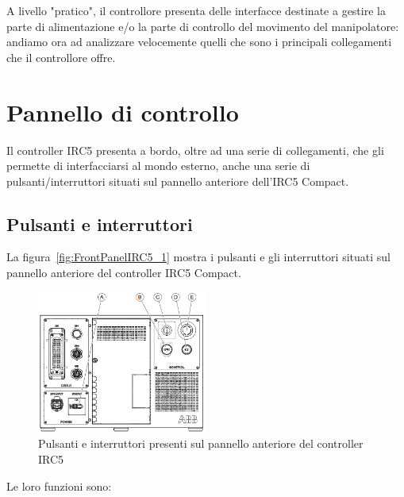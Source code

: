 A livello "pratico", il controllore presenta delle interfacce destinate a gestire la parte di alimentazione e/o la parte di controllo del movimento del manipolatore: andiamo ora ad analizzare velocemente quelli che sono i principali collegamenti che il controllore offre.
\section{Pannello di controllo}
Il controller IRC5 presenta a bordo, oltre ad una serie di collegamenti, che gli permette di interfacciarsi al mondo esterno, anche una serie di pulsanti/interruttori situati sul pannello anteriore dell’IRC5 Compact.

\subsection{Pulsanti e interruttori}
La figura~\vref{fig:FrontPanelIRC5_1} mostra i pulsanti e gli interruttori situati sul pannello anteriore del controller IRC5 Compact.
\begin{figure}[h]
	\centering
	\includegraphics[width=0.5\textwidth]{Immagini/Pulsanti_Interruttori_IRC5}
	\caption{Pulsanti e interruttori presenti sul pannello anteriore del controller IRC5}
	\label{fig:FrontPanelIRC5_1}
\end{figure}
Le loro funzioni sono:
